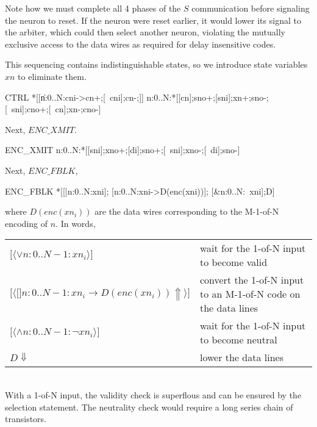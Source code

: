 \documentclass{article}
\begin{document}
\noindent Note how we must complete all 4 phases of the $S$ communication before signaling the neuron to reset. If the neuron were reset earlier, it would lower its signal to the arbiter, which could then select another neuron, violating the mutually exclusive access to the data wires as required for delay insensitive codes. 

This sequencing contains indistinguishable states, so we introduce state variables $xn$ to eliminate them.

\begin{hse}
CTRL\equiv
*[[\langle\|n:0..N:cni->cn+;[~cni];cn-;\rangle]] \pll
\langle\pll\!n:0..N:*[[cn];sno+;[sni];xn+;sno-;[~sni];cno+;[~cn];xn-;cno-]\rangle
\end{hse}

Next, $ENC\_XMIT$.

\begin{hse}
ENC_XMIT\equiv
\langle\pll\!n:0..N:*[[sni];xno+;[di];sno+;[~sni];xno-;[~di];sno-]\rangle
\end{hse}

Next, $ENC\_FBLK$,

\begin{hse}
ENC_FBLK\equiv
*[[\langle|n:0..N:xni\rangle];
  [\langle[]n:0..N:xni->D(enc(xni))\Uparrow\rangle];
  [\langle&n:0..N:~xni\rangle];D\Downarrow]
\end{hse}

\noindent where $D(enc(xn_i))$ are the data wires corresponding to the M-1-of-N encoding of $n$. In words,

\begin{tabular}[]{ll}
  $\texttt{[}\langle \lor n:0..N-1:xn_i\rangle\texttt{]}$ & 
    wait for the 1-of-N input to become valid \\
  $\texttt{[}\langle\texttt{[}\!\!\texttt{]}n:0..N-1:xn_i\rightarrow 
    D(enc(xn_i))\Uparrow\rangle\texttt{]}$ & 
    convert the 1-of-N input to an M-1-of-N code on the data lines \\
  $\texttt{[}\langle\land n:0..N-1:\neg xn_i\rangle\texttt{]}$ & 
    wait for the 1-of-N input to become neutral \\
  $D\Downarrow$ & lower the data lines \\
\end{tabular} \\

\noindent With a 1-of-N input, the validity check is superflous and can be ensured by the selection statement. The neutrality check would require a long series chain of transistors. 
\end{document}
